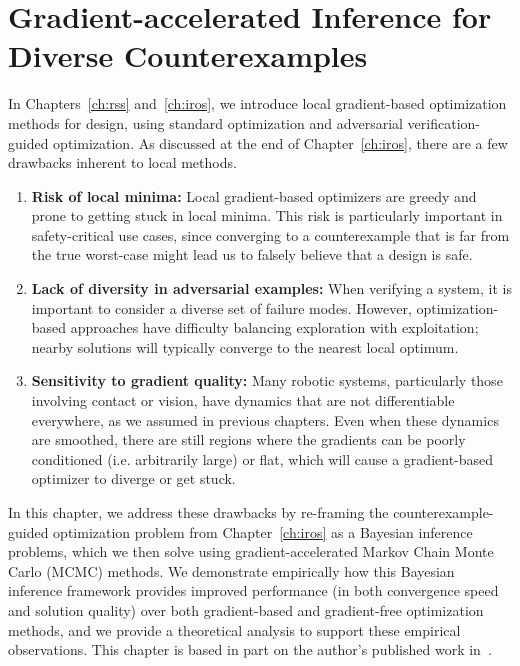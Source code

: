 \chapter{Gradient-accelerated Inference for Diverse Counterexamples}\label{ch:corl}

In Chapters~\ref{ch:rss} and~\ref{ch:iros}, we introduce local gradient-based optimization methods for design, using standard optimization and adversarial verification-guided optimization. As discussed at the end of Chapter~\ref{ch:iros}, there are a few drawbacks inherent to local methods.

\begin{enumerate}
    \item \textbf{Risk of local minima: } Local gradient-based optimizers are greedy and prone to getting stuck in local minima. This risk is particularly important in safety-critical use cases, since converging to a counterexample that is far from the true worst-case might lead us to falsely believe that a design is safe.
    \item \textbf{Lack of diversity in adversarial examples: } When verifying a system, it is important to consider a diverse set of failure modes. However, optimization-based approaches have difficulty balancing exploration with exploitation; nearby solutions will typically converge to the nearest local optimum.
    \item \textbf{Sensitivity to gradient quality: } Many robotic systems, particularly those involving contact or vision, have dynamics that are not differentiable everywhere, as we assumed in previous chapters. Even when these dynamics are smoothed, there are still regions where the gradients can be poorly conditioned (i.e. arbitrarily large) or flat, which will cause a gradient-based optimizer to diverge or get stuck.
\end{enumerate}


In this chapter, we address these drawbacks by re-framing the counterexample-guided optimization problem from Chapter~\ref{ch:iros} as a Bayesian inference problems, which we then solve using gradient-accelerated Markov Chain Monte Carlo (MCMC) methods. We demonstrate empirically how this Bayesian inference framework provides improved performance (in both convergence speed and solution quality) over both gradient-based and gradient-free optimization methods, and we provide a theoretical analysis to support these empirical observations. This chapter is based in part on the author's published work in~\cite{dawsonBayesianApproachBreaking2023}.

